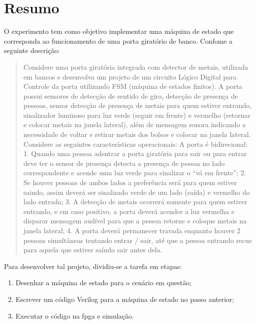 \chapter{Resumo}
	O experimento tem como objetivo implementar uma máquina de estado que corresponda ao
	funcionamento de uma porta giratório de banco. Confome a seguinte descrição:

	\begin{quotation}
		Considere uma porta giratória integrada com detector de metais, utilizada em bancos e
		desenvolva um projeto de um circuito Lógico Digital para Controle da porta utilizando FSM
		(máquina de estados finitos). A porta possui sensores de detecção de sentido de giro, detecção
		de presença de pessoas, sensor detecção de presença de metais para quem estiver entrando,
		sinalizador luminoso para luz verde (seguir em frente) e vermelho (retornar e colocar metais na
		janela lateral), além de mensagem sonora indicando a necessidade de voltar e retirar metais dos
		bolsos e colocar na janela lateral. Considere as seguintes características operacionais:
		A porta é bidirecional:
		1. Quando uma pessoa adentrar a porta giratória para sair ou para entrar deve ter o sensor
		de presença detecta a presença de pessoa no lado correspondente e acende uma luz
		verde para sinalizar o “vá em frente”;
		2. Se houver pessoas de ambos lados a preferência será para quem estiver saindo, assim
		deverá ser sinalizado verde de um lado (saída) e vermelho do lado entrada;
		3. A detecção de metais ocorrerá somente para quem estiver entrando, e em caso positivo,
		a porta deverá acender a luz vermelha e disparar mensagem audível para que a pessoa
		retorne e coloque metais na janela lateral;
		4. A porta deverá permanecer travada enquanto houver 2 pessoas simultâneas tentando
		entrar / sair, até que a pessoa entrando recue para aquela que estiver saíndo sair antes
		dela.
	\end{quotation}

	Para desenvolver tal projeto, dividiu-se a tarefa em etapas:
	\begin{enumerate}
	   \item Desenhar a máquina de estado para o cenário em questão;
	   \item Escrever um código Verilog para a máquina de estado no passo anterior;
	   \item Executar o código na \ac{fpga} e simulação.
	 \end{enumerate}

